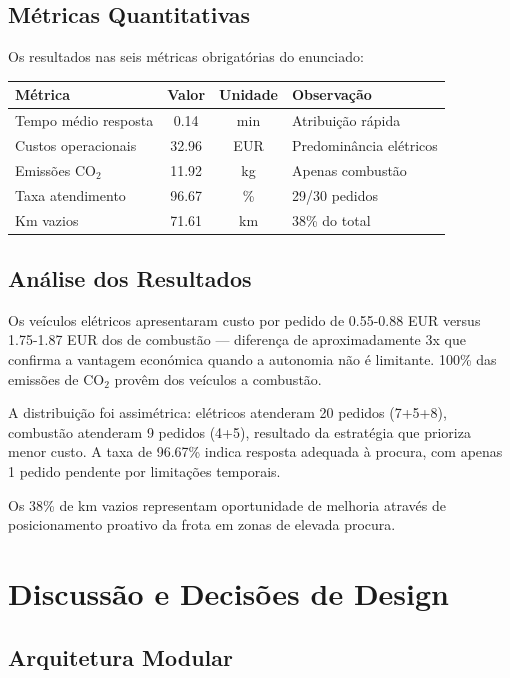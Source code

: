 \documentclass[11pt,a4paper]{article}
\begin{document}
\subsection{Métricas Quantitativas}

Os resultados nas seis métricas obrigatórias do enunciado:

\begin{center}
\begin{tabular}{|l|c|c|l|}
\hline
\textbf{Métrica} & \textbf{Valor} & \textbf{Unidade} & \textbf{Observação} \\
\hline
Tempo médio resposta & 0.14 & min & Atribuição rápida \\
Custos operacionais & 32.96 & EUR & Predominância elétricos \\
Emissões CO$_2$ & 11.92 & kg & Apenas combustão \\
Taxa atendimento & 96.67 & \% & 29/30 pedidos \\
Km vazios & 71.61 & km & 38\% do total \\
\hline
\end{tabular}
\end{center}

\subsection{Análise dos Resultados}

Os veículos elétricos apresentaram custo por pedido de 0.55-0.88 EUR versus 1.75-1.87 EUR dos de combustão --- diferença de aproximadamente 3x que confirma a vantagem económica quando a autonomia não é limitante. 100\% das emissões de CO$_2$ provêm dos veículos a combustão.

A distribuição foi assimétrica: elétricos atenderam 20 pedidos (7+5+8), combustão atenderam 9 pedidos (4+5), resultado da estratégia que prioriza menor custo. A taxa de 96.67\% indica resposta adequada à procura, com apenas 1 pedido pendente por limitações temporais.

Os 38\% de km vazios representam oportunidade de melhoria através de posicionamento proativo da frota em zonas de elevada procura.

\section{Discussão e Decisões de Design}

\subsection{Arquitetura Modular}
\end{document}
